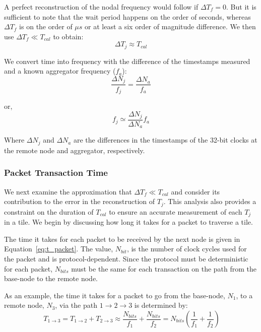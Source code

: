 A perfect reconstruction of the nodal frequency would follow if $\Delta T_{f} = 0$.
But it is sufficient to note that the wait period happens on the order of seconds, whereas $\Delta T_{f}$ is on the order of $\mu s$ or at least a six order of magnitude difference.
We then use $\Delta T_{f} \ll T_{cal}$ to obtain:
\begin{equation}
  \Delta T_{j} \approx T_{cal}
\end{equation}

We convert time into frequency with the difference of the timestamps measured and a known aggregator frequency ($f_{a}$):
\begin{equation}
   \frac{\Delta N_{j}}{f_{j}} = \frac{\Delta N_{a}}{f_{a}}
\end{equation}

or,
\begin{equation}
   \boxed{f_{j} \simeq \frac{\Delta N_{j}}{\Delta N_{a}}f_{a}}
\end{equation}

Where $\Delta N_{j}$ and $\Delta N_{a}$ are the differences in the timestamps of the 32-bit clocks at the remote node and aggregator, respectively.


\subsubsection{Packet Transaction Time}

 We next examine the approximation that $\Delta T_{f} \ll T_{cal}$ and consider its contribution to the error in the reconstruction of $T_{j}$.
This analysis also provides a constraint on the duration of $T_{cal}$ to ensure an accurate measurement of each $T_{j}$ in a tile.
We begin by discussing how long it takes for a packet to traverse a tile.

The time it takes for each packet to be received by the next node is given in Equation~\ref{eq:t_packet}.
The value, $N_{bit}$, is the number of clock cycles used for the packet and is protocol-dependent.
Since the protocol must be deterministic for each packet, $N_{bits}$ must be the same for each transaction on the path from the base-node to the remote node.

As an example, the time it takes for a packet to go from the base-node, $N_{1}$, to a remote node, $N_{3}$, via the path $1\rightarrow 2 \rightarrow 3$ is determined by:
\begin{equation}~\label{eq:t_packetTransfer}
  T_{1\rightarrow 3} = T_{1\rightarrow 2} + T_{2\rightarrow 3} \approx \frac{N_{bits}}{f_{1}} + \frac{N_{bits}}{f_{2}} = N_{bits}(\frac{1}{f_{1}} + \frac{1}{f_{2}})
\end{equation}

